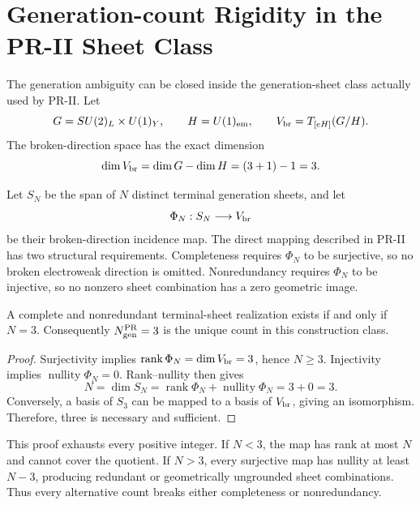 \section{Generation-count Rigidity in the PR-II Sheet Class}
\label{app:generation-count-rigidity}

The generation ambiguity can be closed inside the generation-sheet class
actually used by PR-II.  Let
\begin{equation}
 G=SU(2)_L\times U(1)_Y,
 \qquad H=U(1)_{\rm em},
 \qquad V_{\rm br}=T_{[eH]}(G/H).
\end{equation}
The broken-direction space has the exact dimension
\begin{equation}
 \dim V_{\rm br}=\dim G-\dim H=(3+1)-1=3.
 \label{eq:pr35-broken-dimension}
\end{equation}

Let $S_N$ be the span of $N$ distinct terminal generation sheets, and let
\begin{equation}
 \Phi_N:S_N\longrightarrow V_{\rm br}
 \label{eq:pr35-sheet-incidence-map}
\end{equation}
be their broken-direction incidence map.  The direct mapping described in PR-II has two structural requirements.  Completeness requires $\Phi_N$ to be surjective, so no broken electroweak direction is omitted.  Nonredundancy requires $\Phi_N$ to be injective, so no nonzero sheet combination has a zero geometric image.

\begin{theorem}
A complete and nonredundant terminal-sheet realization exists if and only if $N=3$.  Consequently $N_{\rm gen}^{\rm PR}=3$ is the unique count in this construction class.
\end{theorem}

\begin{proof}
Surjectivity implies $\operatorname{rank}\Phi_N=\dim V_{\rm br}=3$, hence $N\ge3$.  Injectivity implies $\operatorname{nullity}\Phi_N=0$.  Rank--nullity then gives
\begin{equation}
 N=\dim S_N
 =\operatorname{rank}\Phi_N+\operatorname{nullity}\Phi_N
 =3+0=3.
\end{equation}
Conversely, a basis of $S_3$ can be mapped to a basis of $V_{\rm br}$, giving an isomorphism.  Therefore, three is necessary and sufficient.
\end{proof}

This proof exhausts every positive integer.  If $N<3$, the map has rank at
most $N$ and cannot cover the quotient.  If $N>3$, every surjective map has
nullity at least $N-3$, producing redundant or geometrically ungrounded sheet
combinations.  Thus every alternative count breaks either completeness or
nonredundancy.

